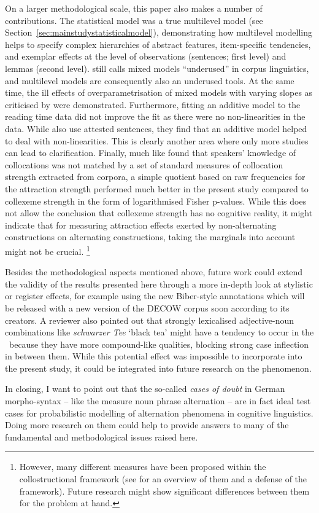 On a larger methodological scale, this paper also makes a number of contributions.
The statistical model was a true multilevel model (see Section~\ref{sec:mainstudystatisticalmodel}), demonstrating how multilevel modelling helps to specify complex hierarchies of abstract features, item-specific tendencies, and exemplar effects at the level of observations (sentences; first level) and lemmas (second level).
\cite{Gries2015} still calls mixed models ``underused'' in corpus linguistics, and multilevel models are consequently also an underused tools.
At the same time, the ill effects of overparametrisation of mixed models with varying slopes as criticised by \cite{BatesEa2015a} were demonstrated.
Furthermore, fitting an additive model to the reading time data did not improve the fit as there were no non-linearities in the data.
While \cite{DivjakEa2016} also use attested sentences, they find that an additive model helped to deal with non-linearities.
This is clearly another area where only more studies can lead to clarification.
Finally, much like \cite{Dabrowska2014} found that speakers' knowledge of collocations was not matched by a set of standard measures of collocation strength extracted from corpora, a simple quotient based on raw frequencies for the attraction strength performed much better in the present study compared to collexeme strength in the form of logarithmised Fisher p-values. 
While this does not allow the conclusion that collexeme strength has no cognitive reality, it might indicate that for measuring attraction effects exerted by non-alternating constructions on alternating constructions, taking the marginals into account might not be crucial.%
\footnote{However, many different measures have been proposed within the collostructional framework (see \citealp{Gries2015b} for an overview of them and a defense of the framework).
Future research might show significant differences between them for the problem at hand.}

Besides the methodological aspects mentioned above, future work could extend the validity of the results presented here through a more in-depth look at stylistic or register effects, for example using the new Biber-style annotations \citep{Biber1988} which will be released with a new version of the DECOW corpus soon according to its creators.
A reviewer also pointed out that strongly lexicalised adjective-noun combinations like \textit{schwarzer Tee} `black tea' might have a tendency to occur in the \NACa\ because they have more compound-like qualities, blocking strong case inflection in between them.
While this potential effect was impossible to incorporate into the present study, it could be integrated into future research on the phenomenon.

In closing, I want to point out that the so-called \textit{cases of doubt} in German morpho-syntax -- like the measure noun phrase alternation -- are in fact ideal test cases for probabilistic modelling of alternation phenomena in cognitive linguistics.
Doing more research on them could help to provide answers to many of the fundamental and methodological issues raised here.
